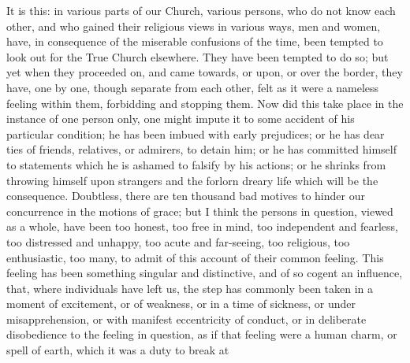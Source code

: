 It is this: in various parts of our Church, various persons, who do
not know each other, and who gained their religious views in various
ways, men and women, have, in consequence of the miserable confusions
of the time, been tempted to look out for the True Church elsewhere.
They have been tempted to do so; but yet when they proceeded on, and
came towards, or upon, or over the border, they have, one by one,
though separate from each other, felt as it were a nameless feeling
within them, forbidding and stopping them. Now did this take place in
the instance of one person only, one might impute it to some accident
of his particular condition; he has been imbued with early prejudices;
or he has dear ties of friends, relatives, or admirers, to detain him;
or he has committed himself to statements which he is ashamed to
falsify by his actions; or he shrinks from throwing himself upon
strangers and the forlorn dreary life which will be the consequence.
Doubtless, there are ten thousand bad motives to hinder our
concurrence in the motions of grace; but I think the persons in
question, viewed as a whole, have been too honest, too free in mind,
too independent and fearless, too distressed and unhappy, too acute
and far-seeing, too religious, too enthusiastic, too many, to admit of
this account of their common feeling. This feeling has been something
singular and distinctive, and of so cogent an influence, that, where
individuals have left us, the step has commonly been taken in a moment
of excitement, or of weakness, or in a time of sickness, or under
misapprehension, or with manifest eccentricity of conduct, or in
deliberate disobedience to the feeling in question, as if that feeling
were a human charm, or spell of earth, which it was a duty to break at
